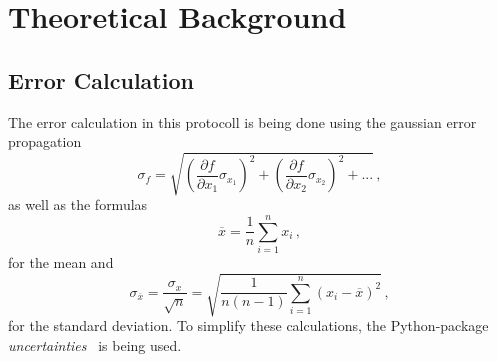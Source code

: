 \section{Theoretical Background}
\label{sec:Theory}

\subsection{Error Calculation}
The error calculation in this protocoll is being done using the gaussian error propagation
\begin{equation}
    \sigma_f = \sqrt{\left( \frac{\partial f}{\partial x_1} \sigma_{x_1} \right)^2 + \left( \frac{\partial f}{\partial x_2} \sigma_{x_2} \right)^2 + ...} \, ,
\end{equation}
as well as the formulas 
\begin{equation}
    \overline{x} = \frac{1}{n} \sum^n_{i=1}x_i \, ,
    \label{eq:mittelwert}
\end{equation}
for the mean and 
\begin{equation}
    \sigma_{\overline{x}} = \frac{\sigma_x}{\sqrt{n}} = \sqrt{\frac{1}{n(n-1)}  \sum^n_{i=1} \left( x_i - \overline{x}\right)^2 } \, ,
    \label{eq:abweichung}
\end{equation}
for the standard deviation. 
To simplify these calculations, the Python-package \textit{uncertainties}~\cite{uncertainties} is being used. 

\clearpage
